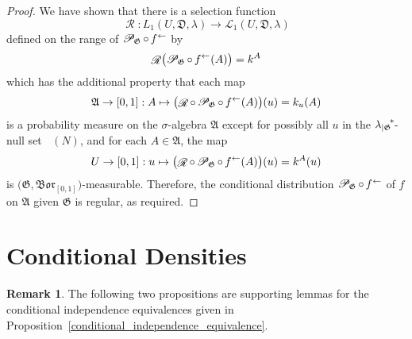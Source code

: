 \documentclass[
twoside=true,
paper=letter,
fontsize=9pt,
pagesize=auto,
leqno,
openany,
headsepline,
overfullrule,
]{scrbook}
\theoremstyle{plain}
\theoremstyle{plain}
\theoremstyle{definition}
\newtheorem{rmk}[thm]{Remark}
\theoremstyle{bfnoteitalic}
\theoremstyle{bfnoteroman}
\newcommand{\sigalg}[1]{\mathfrak{#1}}
\newcommand{\cali}[1]{\mathscr{#1}}
\newcommand{\condprobop}[1]{\mathop{\cali{P}\hspace{-1pt}}\nolimits_{#1}}
\newcommand{\borel}{\mathfrak{Bor}}
\newcommand{\textsigma}{\hbox{\large{$\sigma$}}\kern-1pt}
\newcommand{\restrictedto}[1]{_{\lvert#1}\kern-1.5pt}
\newcommand{\preimage}[1]{\mathop{#1^{\leftarrow}}}
\newcommand{\sigmaalgebra}{\sigalg{A}}
\newcommand{\kernast}{\ast\kern-1pt}
\newcommand{\funcf}{f}
\newcommand{\funcg}{g}
\newcommand{\funck}{k}
\newcommand{\function}{f}
\newcommand{\measlambda}{\lambda}
\newcommand{\seti}{A}
\newcommand{\regular}{\mathop{\cali{R}}}
\newcommand{\uspace}{U}%
\newcommand{\uspaceelt}{u}
\newcommand{\uspacesig}{\sigalg{D}}
\begin{document}
\begin{proof}
We have shown that there is a selection function
\[
\regular:
L_1(\uspace,\uspacesig,\measlambda)
\to
\cali{L}_1(\uspace,\uspacesig,\measlambda)
\]
defined on the range of
$\condprobop{\sigalg{G}}\circ \preimage{\funcf}$
by
\[
\regular\bigl(
\condprobop{\sigalg{G}}\circ \preimage{\funcf}(\seti)
\bigr)
=
\funck^\seti
\]
which has the additional property that each map
\[
\sigmaalgebra\to [0,1]: \seti \mapsto
\bigl( \regular\circ\condprobop{\sigalg{G}} \circ\preimage{\function}
(\seti)\bigr)(\uspaceelt)
= \funck_\uspaceelt(\seti)
\]
is a probability measure on the \textsigma\hyp{}algebra $\sigmaalgebra$ except for possibly all
$\uspaceelt$ in the
${\measlambda\restrictedto{\sigalg{G}}}^\kernast$-null set
$\preimage{\funcg}(N)$,
and for each
$\seti\in\sigmaalgebra$, the map
\[
\uspace\to [0,1] : \uspaceelt\mapsto
\bigl( \regular\circ\condprobop{\sigalg{G}}\circ\preimage{\function}
(\seti)\bigr)(\uspaceelt)
= \funck^\seti(\uspaceelt)
\]
is $\bigl(\sigalg{G}, \borel_{[0,1]}\bigr)$\hyp{}measurable.
Therefore, the conditional distribution
$\condprobop{\sigalg{G}}\circ \preimage{\funcf}$ of $\funcf$ on
$\sigmaalgebra$ given $\sigalg{G}$ is regular, as required.
\end{proof}




\section{Conditional Densities}
\begin{rmk}
The following two propositions are supporting lemmas for the conditional independence equivalences given in Proposition~\ref{conditional_independence_equivalence}.
\end{rmk}
\end{document}
